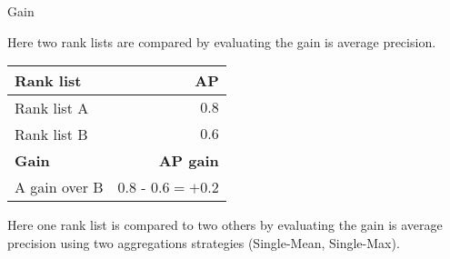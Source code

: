 \begin{example}
  \centering
  \caption{Gain}
  \label{ex:gain}

  \begin{subexample}{\linewidth}
    \centering

    Here two rank lists are compared by evaluating the gain is average precision.

    \vspace{0.2cm}

    \begin{tabular}{l r}
      \toprule
      \textbf{Rank list} & \textbf{AP} \\
      \midrule
      Rank list A & $0.8$ \\
      Rank list B & $0.6$ \\
      \midrule
      \textbf{Gain} & \textbf{AP gain} \\
      A gain over B & $0.8$ - $0.6 = +0.2$ \\
      \bottomrule
    \end{tabular}
  \end{subexample}

  \vspace{0.5cm}

  \begin{subexample}{\linewidth}
    \centering

    Here one rank list is compared to two others by evaluating the gain is average precision using two aggregations strategies (Single-Mean, Single-Max).

    \vspace{0.2cm}

  \end{subexample}

\end{example}
